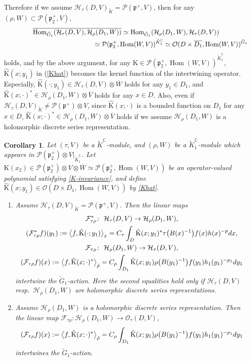 \documentclass[11pt]{article}
\numberwithin{equation}{section}
\newtheorem{Corollary}[Theorem]{Corollary}
\newcommand{\BC}{\mathbb{C}}
\newcommand{\fp}{\mathfrak{p}}
\newcommand{\cF}{\mathcal{F}}
\newcommand{\cH}{\mathcal{H}}
\newcommand{\cO}{\mathcal{O}}
\newcommand{\cP}{\mathcal{P}}
\newcommand{\rK}{\mathrm{K}}
\newcommand{\Hom}{\operatorname{Hom}}
\begin{document}
Therefore if we assume $\cH_\tau(D,V)_{\tilde{K}}=\cP(\fp^+,V)$, then for any $(\rho,W)\subset \cP(\fp^+_2,V)$,
\begin{gather*}
 \overline{\Hom_{\tilde{G}_1}(\cH_\tau(D,V),\cH_\rho(D_1,W))}\simeq \Hom_{\tilde{G}_1}(\cH_\rho(D_1,W),\cH_\tau(D,V)) \\
\hphantom{\overline{\Hom_{\tilde{G}_1}(\cH_\tau(D,V),\cH_\rho(D_1,W))}}{} \simeq \cP(\fp^+_2,\Hom(W,V))^{\tilde{K}^\BC_1}\simeq \cO(D\times \overline{D_1}, \Hom(W,V))^{\tilde{G}_1}
\end{gather*}
holds, and by the above argument,
for any $\rK\in\cP(\fp^+_2,\Hom(W,V))^{\tilde{K}^\BC_1}$, $\hat{\rK}(x;y_1)$ in (\ref{Khat}) becomes
the kernel function of the intertwining operator.
Especially, $\hat{\rK}(\cdot;y_1)\in\cH_\tau(D,V)\otimes \overline{W}$ holds for any $y_1\in D_1$,
and $\hat{\rK}(x;\cdot)^*\in\cH_{\rho}(D_1,W)\otimes \overline{V}$ holds for any $x\in D$.
Also, even if $\cH_\tau(D,V)_{\tilde{K}}\ne\cP(\fp^+)\otimes V$, since $\hat{\rK}(x;\cdot)$ is a bounded function on $D_1$ for any $x\in D$,
$\hat{\rK}(x;\cdot)^*\in\cH_{\rho}(D_1,W)\otimes \overline{V}$ holds
if we assume $\cH_\rho(D_1,W)$ is a holomorphic discrete series representation.
\begin{Corollary}\label{integral_expression}
Let $(\tau,V)$ be a $\tilde{K}^\BC$-module, and $(\rho,W)$ be a $\tilde{K}_1^\BC$-module
which appears in $\cP(\fp^+_2)\otimes V|_{\tilde{K}_1^\BC}$.
Let $\rK(x_2)\in \cP(\fp^+_2)\otimes V\otimes\overline{W}\simeq\cP(\fp^+_2,\Hom(W,V))$ be an operator-valued polynomial
satisfying \eqref{K-invariance}, and define $\hat{\rK}(x;y_1)\in\cO(D\times\overline{D_1},\Hom(W,V))$ by \eqref{Khat}.
\begin{enumerate}\itemsep=0pt
\item[$(1)$] Assume $\cH_\tau(D,V)_{\tilde{K}}=\cP(\fp^+,V)$. Then the linear maps
\begin{gather*}
\cF_{\tau\rho}^*\colon \ \cH_\tau(D,V)\to\cH_\rho(D_1,W), \\
(\cF_{\tau\rho}^*f)(y_1):=\big\langle f,\hat{\rK}(\cdot;y_1)\big\rangle_{\hat{\tau}}
=C_\tau\int_D\hat{\rK}(x;y_1)^*\tau\big(B(x)^{-1}\big)f(x)h(x)^{-p}{\rm d}x, \\
\cF_{\tau\rho}\colon \ \cH_\rho(D_1,W)\to \cH_\tau(D,V), \\
(\cF_{\tau\rho}f)(x):=\big\langle f,\hat{\rK}(x;\cdot)^*\big\rangle_{\hat{\rho}}
=C_\rho\int_{D_1}\hat{\rK}(x;y_1)\rho\big(B(y_1)^{-1}\big)f(y_1)h_1(y_1)^{-p_1}{\rm d}y_1
\end{gather*}
intertwine the $\tilde{G}_1$-action. Here the second equalities hold only if $\cH_\tau(D{,}V)$ resp.~$\cH_\rho(D_1{,}W)$ are holomorphic discrete series representations.
\item[$(2)$] Assume $\cH_\rho(D_1,W)$ is a holomorphic discrete series representation.
Then the linear map $\cF_{\tau\rho}\colon \cH_\rho(D_1,W)\to \cO_\tau(D,V)$,
\begin{gather*} (\cF_{\tau\rho}f)(x):=\big\langle f,\hat{\rK}(x;\cdot)^*\big\rangle_{\hat{\rho}}
=C_\rho\int_{D_1}\hat{\rK}(x;y_1)\rho\big(B(y_1)^{-1}\big)f(y_1)h_1(y_1)^{-p_1}{\rm d}y_1 \end{gather*}
intertwines the $\tilde{G}_1$-action.
\end{enumerate}
\end{Corollary}
\end{document}
